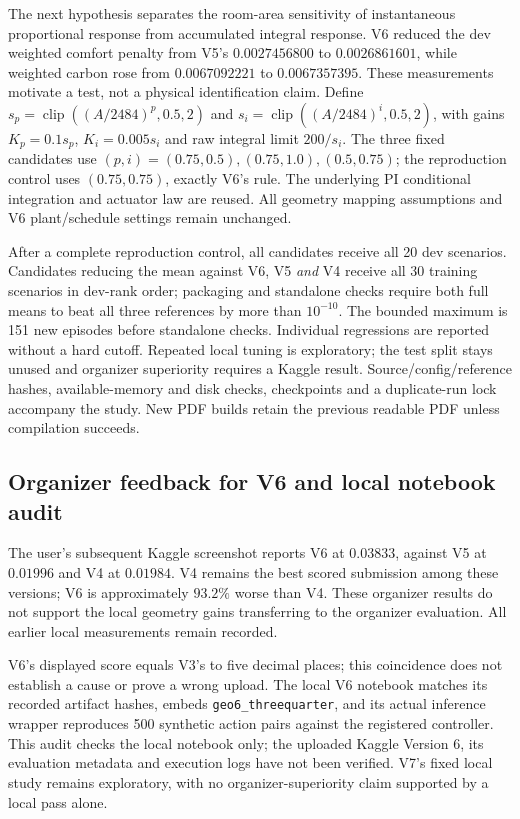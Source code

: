 The next hypothesis separates the room-area sensitivity of instantaneous
proportional response from accumulated integral response. V6 reduced the dev
weighted comfort penalty from V5's $0.0027456800$ to $0.0026861601$, while
weighted carbon rose from $0.0067092221$ to $0.0067357395$. These measurements
motivate a test, not a physical identification claim. Define
$s_p=\operatorname{clip}((A/2484)^p,0.5,2)$ and
$s_i=\operatorname{clip}((A/2484)^i,0.5,2)$, with gains
$K_p=0.1s_p$, $K_i=0.005s_i$ and raw integral limit $200/s_i$.
The three fixed candidates use $(p,i)=(0.75,0.5),(0.75,1.0),(0.5,0.75)$;
the reproduction control uses $(0.75,0.75)$, exactly V6's rule.
The underlying PI conditional integration and actuator law are reused.
All geometry mapping assumptions and V6 plant/schedule settings remain unchanged.

After a complete reproduction control, all candidates receive all 20 dev
scenarios. Candidates reducing the mean against V6, V5 \emph{and} V4 receive
all 30 training scenarios in dev-rank order; packaging and standalone checks
require both full means to beat all three references by more than $10^{-10}$.
The bounded maximum is 151 new episodes before standalone checks.
Individual regressions are reported without a hard cutoff. Repeated local
tuning is exploratory; the test split stays unused and organizer superiority
requires a Kaggle result. Source/config/reference hashes, available-memory
and disk checks, checkpoints and a duplicate-run lock accompany the study.
New PDF builds retain the previous readable PDF unless compilation succeeds.



\subsection{Organizer feedback for V6 and local notebook audit}
The user's subsequent Kaggle screenshot reports V6 at $0.03833$, against
V5 at $0.01996$ and V4 at $0.01984$. V4 remains the best scored submission
among these versions; V6 is approximately $93.2\%$ worse than V4.
These organizer results do not support the local geometry gains transferring
to the organizer evaluation. All earlier local measurements remain recorded.

V6's displayed score equals V3's to five decimal places; this coincidence
does not establish a cause or prove a wrong upload. The local V6 notebook
matches its recorded artifact hashes, embeds \texttt{geo6\_threequarter}, and
its actual inference wrapper reproduces 500 synthetic action pairs against
the registered controller. This audit checks the local notebook only; the
uploaded Kaggle Version 6, its evaluation metadata and execution logs have
not been verified. V7's fixed local study remains exploratory, with no
organizer-superiority claim supported by a local pass alone.

